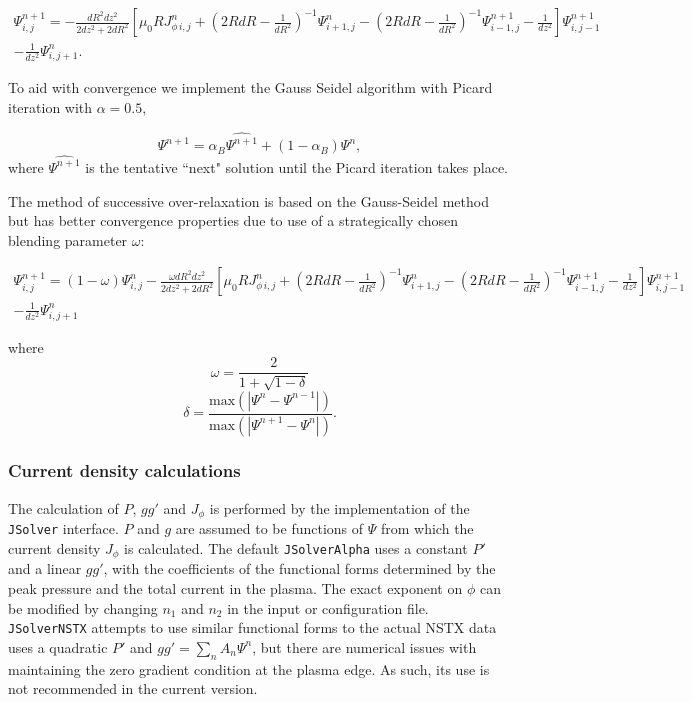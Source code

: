 \documentclass[paper=letter, fontsize=11pt]{scrartcl} %
\begin{document}
\begin{multline} \label{eq:gaussseidel}
\Psi^{n+1}_{i,j} = -\frac{dR^2 dz^2}{2dz^2 + 2dR^2} \left[ \mu_0 R J^n_{\phi \, i, j} + \left(2 R dR - \frac{1}{dR^2}\right)^{-1} \Psi^{n}_{i+1,j} - \left(2 R dR - \frac{1}{dR^2}\right)^{-1} \Psi^{n+1}_{i-1,j} - \frac{1}{dz^2} \right] \Psi^{n+1}_{i,j-1} \\ - \frac{1}{dz^2}\Psi^n_{i, j+1}. 
\end{multline}

To aid with convergence we implement the Gauss Seidel algorithm with Picard iteration with $\alpha = 0.5$, 

\begin{equation} \label{eq:picard}
\Psi^{n+1} = \alpha_B \widehat{\Psi^{n+1}} + (1 - \alpha_{B}) \Psi^n, 
\end{equation}
where $\widehat{\Psi^{n+1}}$ is the tentative ``next" solution until the Picard iteration takes place.

The method of successive over-relaxation is based on the Gauss-Seidel method but has better convergence properties due to use of a strategically chosen blending parameter $\omega$: 

\begin{multline} \label{eq:SOR}
\Psi^{n+1}_{i,j} = (1-\omega)\Psi^n_{i,j} -\frac{\omega dR^2 dz^2}{2dz^2 + 2dR^2} \left[ \mu_0 R J^n_{\phi \, i, j} + \left(2 R dR - \frac{1}{dR^2}\right)^{-1} \Psi^{n}_{i+1,j} - \left(2 R dR - \frac{1}{dR^2}\right)^{-1} \Psi^{n+1}_{i-1,j} - \frac{1}{dz^2} \right] \Psi^{n+1}_{i,j-1} \\ - \frac{1}{dz^2}\Psi^n_{i, j+1}
\end{multline}

where
\begin{equation}
\omega = \frac{2}{1 + \sqrt{1 - \delta}}
\end{equation}
\begin{equation}
\delta = \frac{\text{max} (\left| \Psi^n - \Psi^{n-1} \right| )}{\text{max} (\left| \Psi^{n+1} - \Psi^{n} \right| )}.
\end{equation}

\subsubsection{Current density calculations}
The calculation of $P$, $gg'$ and $J_\phi$ is performed by the implementation of the \texttt{JSolver} interface. $P$ and $g$ are assumed to be functions of $\Psi$ from which the current density $J_\phi$ is calculated. The default \texttt{JSolverAlpha} uses a constant $P'$ and a linear $gg'$, with the coefficients of the functional forms determined by the peak pressure and the total current in the plasma. The exact exponent on $\phi$ can be modified by changing $n_1$ and $n_2$ in the input or configuration file. \texttt{JSolverNSTX} attempts to use similar functional forms to the actual NSTX data uses a quadratic $P'$ and $gg' = \sum_n A_n\Psi^n$, but there are numerical issues with maintaining the zero gradient condition at the plasma edge. As such, its use is not recommended in the current version. 
\end{document}
